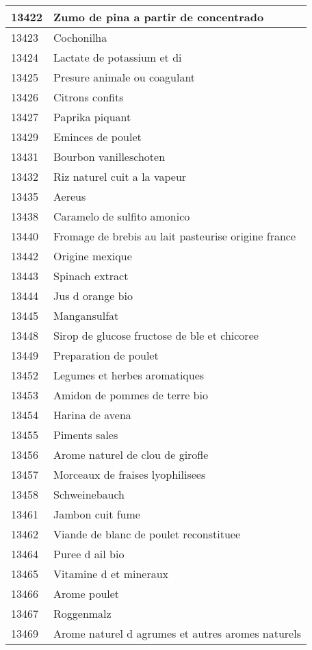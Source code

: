 \begin{longtable}{|l|l|}
13422 & Zumo de pina a partir de concentrado \\ \hline 
13423 & Cochonilha \\ \hline 
13424 & Lactate de potassium et di \\ \hline 
13425 & Presure animale ou coagulant \\ \hline 
13426 & Citrons confits \\ \hline 
13427 & Paprika piquant \\ \hline 
13429 & Eminces de poulet \\ \hline 
13431 & Bourbon vanilleschoten \\ \hline 
13432 & Riz naturel cuit a la vapeur \\ \hline 
13435 & Aereus \\ \hline 
13438 & Caramelo de sulfito amonico \\ \hline 
13440 & Fromage de brebis au lait pasteurise origine france \\ \hline 
13442 & Origine mexique \\ \hline 
13443 & Spinach extract \\ \hline 
13444 & Jus d orange bio \\ \hline 
13445 & Mangansulfat \\ \hline 
13448 & Sirop de glucose fructose de ble et chicoree \\ \hline 
13449 & Preparation de poulet \\ \hline 
13452 & Legumes et herbes aromatiques \\ \hline 
13453 & Amidon de pommes de terre bio \\ \hline 
13454 & Harina de avena \\ \hline 
13455 & Piments sales \\ \hline 
13456 & Arome naturel de clou de girofle \\ \hline 
13457 & Morceaux de fraises lyophilisees \\ \hline 
13458 & Schweinebauch \\ \hline 
13461 & Jambon cuit fume \\ \hline 
13462 & Viande de blanc de poulet reconstituee \\ \hline 
13464 & Puree d ail bio \\ \hline 
13465 & Vitamine d et mineraux \\ \hline 
13466 & Arome poulet \\ \hline 
13467 & Roggenmalz \\ \hline 
13469 & Arome naturel d agrumes et autres aromes naturels \\ \hline 

\end{longtable}
